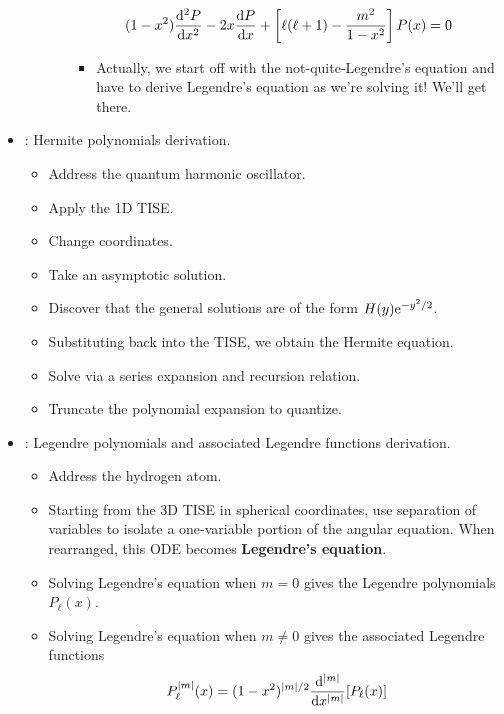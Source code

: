 \documentclass[../finalProject.tex]{subfiles}
\begin{document}
\begin{itemize}
\begin{itemize}
\begin{itemize}
            \begin{equation*}
                (1-x^2)\dv[2]{P}{x}-2x\dv{P}{x}+\left[ \ell(\ell+1)-\frac{m^2}{1-x^2} \right]P(x) = 0
            \end{equation*}
            \begin{itemize}
                \item Actually, we start off with the not-quite-Legendre's equation and have to derive Legendre's equation as we're solving it! We'll get there.
            \end{itemize}
        \end{itemize}
    \end{itemize}
    \item \textcite[28-31]{bib:CHEM26100Notes}: Hermite polynomials derivation.
    \begin{itemize}
        \item Address the quantum harmonic oscillator.
        \item Apply the 1D TISE.
        \item Change coordinates.
        \item Take an asymptotic solution.
        \item Discover that the general solutions are of the form $H(y)\e[-y^2/2]$.
        \item Substituting back into the TISE, we obtain the Hermite equation.
        \item Solve via a series expansion and recursion relation.
        \item Truncate the polynomial expansion to quantize.
    \end{itemize}
    \item \textcite[56-65]{bib:CHEM26100Notes}: Legendre polynomials and associated Legendre functions derivation.
    \begin{itemize}
        \item Address the hydrogen atom.
        \item Starting from the 3D TISE in spherical coordinates, use separation of variables to isolate a one-variable portion of the angular equation. When rearranged, this ODE becomes \textbf{Legendre's equation}.
        \item Solving Legendre's equation when $m=0$ gives the Legendre polynomials $P_\ell(x)$.
        \item Solving Legendre's equation when $m\neq 0$ gives the associated Legendre functions
        \begin{equation*}
            P_\ell^{|m|}(x) = (1-x^2)^{|m|/2}\dv[|m|]{x}[P_\ell(x)]
        \end{equation*}
    \end{itemize}
\end{itemize}
\end{document}
